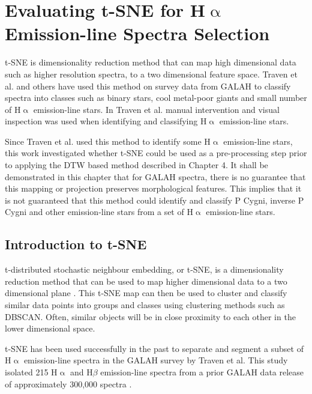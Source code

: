 \chapter{Evaluating t-SNE for H$\upalpha$ Emission-line Spectra Selection}

t-SNE is dimensionality reduction method that can map high dimensional data such as higher resolution spectra, to a two dimensional feature space. Traven et al. and others have used this method on survey data from GALAH to classify spectra into classes such as binary stars, cool metal-poor giants and small number of H$\upalpha$ emission-line stars. In Traven et al. manual intervention and visual inspection was used when identifying and classifying H$\upalpha$ emission-line stars.

Since Traven et al. used this method to identify some H$\upalpha$ emission-line stars, this work investigated whether t-SNE could be used as a pre-processing step prior to applying the DTW based method described in Chapter 4. It shall be demonstrated in this chapter that for GALAH spectra, there is no guarantee that this mapping or projection preserves morphological features. This implies that it is not guaranteed that this method could identify and classify P Cygni, inverse P Cygni and other emission-line stars from a set of H$\upalpha$ emission-line stars. 

\section{Introduction to t-SNE}

t-distributed stochastic neighbour embedding, or t-SNE, is a dimensionality reduction method that can be used to map higher dimensional data to a two dimensional plane \citep{van2008visualizing} . This t-SNE map can then be used to cluster and classify similar data points into groups and classes using clustering methods such as DBSCAN. Often, similar objects will be in close proximity to each other in the lower dimensional space.

t-SNE has been used successfully in the past to separate and segment a subset of H$\upalpha$ emission-line spectra in the GALAH survey by Traven et al. This study isolated 215 H$\upalpha$ and H$\beta$ emission-line spectra from a prior GALAH data release of approximately 300,000 spectra \citep{traven2017galah}.

